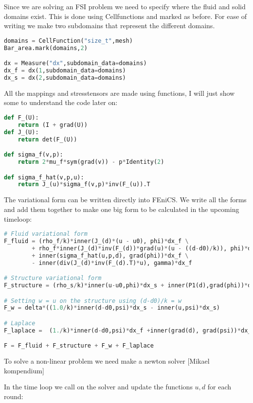Since we are solving an FSI problem we need to specify where the fluid and solid domains exist. This is done using Cellfunctions and marked as before. For ease of writing we make two subdomains that represent the different domains.

\begin{lstlisting}[language=Python]
domains = CellFunction("size_t",mesh)
Bar_area.mark(domains,2) 

dx = Measure("dx",subdomain_data=domains)
dx_f = dx(1,subdomain_data=domains)
dx_s = dx(2,subdomain_data=domains)
\end{lstlisting}

All the mappings and stresstensors are made using functions, I will just show some to understand the code later on:

\begin{lstlisting}[language=Python]
def F_(U):
	return (I + grad(U))
def J_(U):
	return det(F_(U))

def sigma_f(v,p):
	return 2*mu_f*sym(grad(v)) - p*Identity(2)

def sigma_f_hat(v,p,u):
	return J_(u)*sigma_f(v,p)*inv(F_(u)).T
\end{lstlisting}

The variational form can be written directly into FEniCS. We write all the forms and add them together to make one big form to be calculated in the upcoming timeloop:
\begin{lstlisting}[language=Python]
# Fluid variational form
F_fluid = (rho_f/k)*inner(J_(d)*(u - u0), phi)*dx_f \
        + rho_f*inner(J_(d)*inv(F_(d))*grad(u)*(u - ((d-d0)/k)), phi)*dx_f \
        + inner(sigma_f_hat(u,p,d), grad(phi))*dx_f \
        - inner(div(J_(d)*inv(F_(d).T)*u), gamma)*dx_f

# Structure variational form
F_structure = (rho_s/k)*inner(u-u0,phi)*dx_s + inner(P1(d),grad(phi))*dx_s

# Setting w = u on the structure using (d-d0)/k = w
F_w = delta*((1.0/k)*inner(d-d0,psi)*dx_s - inner(u,psi)*dx_s)

# Laplace
F_laplace =  (1./k)*inner(d-d0,psi)*dx_f +inner(grad(d), grad(psi))*dx_f 

F = F_fluid + F_structure + F_w + F_laplace
\end{lstlisting}

To solve a non-linear problem we need make a newton solver [Mikael kompendium]


In the time loop we call on the solver and update the functions $ u,d$ for each round:

